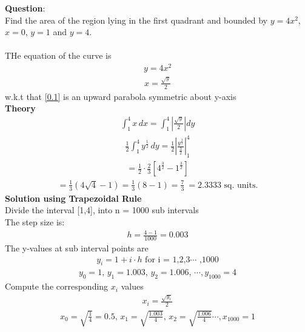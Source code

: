 \documentclass[journal]{IEEEtran}
\begin{document}
\textbf{Question}:\\
Find the area of the region lying in the first quadrant and bounded by $y=4x^2$, $x=0$, $y=1$ and $y=4$. \\ 
\solution \\
THe equation of the curve is 
\begin{align}
     y = 4x^2
     \label{0.1}
\end{align}
\begin{align}
    x = \frac{\sqrt{y}}{2}
\end{align}
w.k.t that \ref{0.1} is an upward parabola symmetric about y-axis\\
\textbf{Theory}
\begin{align}
    \int_1^4 x \, dx = \int_1^4 \left| \frac{\sqrt{y}}{2} \right| dy
\end{align}
\begin{align}
    \frac{1}{2} \int_1^4 y^{\frac{1}{2}} \, dy = \frac{1}{2} \left| \frac{y^{\frac{3}{2}}}{\frac{3}{2}} \right|_1^4
\end{align}
\begin{align}
    = \frac{1}{2} \cdot \frac{2}{3} \left[ 4^{\frac{3}{2}} - 1^{\frac{3}{2}} \right]
\end{align}
\begin{align}
    = \frac{1}{3} \left( 4\sqrt{4} - 1 \right) = \frac{1}{3} (8 - 1) = \frac{7}{3} \ = 2.3333 \text{ sq. units.} 
\end{align}
\textbf{Solution using Trapezoidal Rule}\\
Divide the interval [1,4], into n = 1000 sub intervals\\
The step size is:
\begin{align}
    h=\frac{4-1}{1000} = 0.003
\end{align}
The y-values at sub interval points are
\begin{align}
     y_i = 1 + i\cdot h \text{  for i = 1,2,3$\cdots$ ,1000}
 \end{align}
\begin{align}
     y_0 = 1 \text{,  } y_1 = 1.003 \text{, }y_2 = 1.006 \text{, } \cdots ,y_{1000} = 4 
\end{align}
Compute the corresponding $x_i$ values 
\begin{align}
    x_i = \frac{\sqrt{y_i}}{2}
\end{align}
\begin{align}
     x_0 = \sqrt{\frac{1}{4}} = 0.5 \text{, }x_1 = \sqrt{\frac{1.003}{4}} \text{, }x_2 = \sqrt{\frac{1.006}{4}}\cdots, x_{1000}= 1
\end{align}
\end{document}
